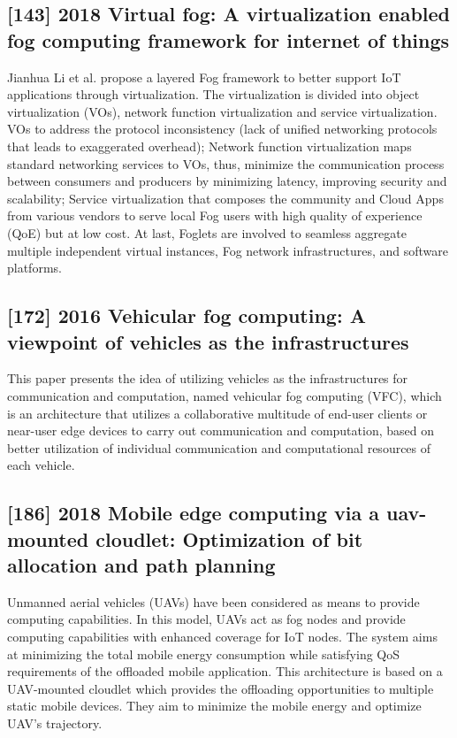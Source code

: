 \subsection{[143] 2018 Virtual fog: A virtualization enabled fog computing framework for internet of things}
\label{subsec:paper04}
Jianhua Li et al. \cite{li2018virtual} propose a layered Fog framework to better support IoT applications through virtualization. The virtualization is divided into object virtualization (VOs), network function virtualization and service virtualization. VOs to address the protocol inconsistency (lack of unified networking protocols that leads to exaggerated overhead); Network function virtualization maps standard networking services to VOs, thus, minimize the communication process between consumers and producers by minimizing latency, improving security and scalability; Service virtualization that composes the community and Cloud Apps from various vendors to serve local Fog users with high quality of experience (QoE) but at low cost. At last, Foglets are involved to seamless aggregate multiple independent virtual instances, Fog network infrastructures, and software platforms.

\subsection{[172] 2016 Vehicular fog computing: A viewpoint of vehicles as the infrastructures}
\label{subsec:paper05} \cite{hou2016vehicular}
This paper presents the idea of utilizing vehicles as the infrastructures for communication and computation, named vehicular fog computing (VFC), which is an architecture that utilizes a collaborative multitude of end-user clients or near-user edge devices to carry out communication and computation, based on better utilization of individual communication and computational resources of each vehicle.

\subsection{[186] 2018 Mobile edge computing via a uav-mounted cloudlet: Optimization of bit allocation and path planning}
\label{subsec:paper06} \cite{jeong2018mobile}
Unmanned aerial vehicles (UAVs) have been considered as means to provide computing capabilities. In this model, UAVs act as fog nodes and provide computing capabilities with enhanced coverage for IoT nodes. The system aims at minimizing the total mobile energy consumption while satisfying QoS requirements of the offloaded mobile application. This architecture is based on a UAV-mounted cloudlet which provides the offloading opportunities to multiple static mobile devices. They aim to minimize the mobile energy and optimize UAV’s trajectory.

